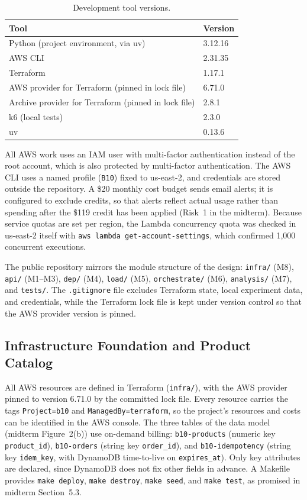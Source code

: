 \documentclass[10pt]{article}
\begin{document}
\begin{table}[htbp]
\centering
\footnotesize
\begin{tabular}{@{}ll@{}}
\toprule
\textbf{Tool} & \textbf{Version} \\
\midrule
Python (project environment, via uv) & 3.12.16 \\
AWS CLI & 2.31.35 \\
Terraform & 1.17.1 \\
AWS provider for Terraform (pinned in lock file) & 6.71.0 \\
Archive provider for Terraform (pinned in lock file) & 2.8.1 \\
k6 (local tests) & 2.3.0 \\
uv & 0.13.6 \\
\bottomrule
\end{tabular}
\caption{Development tool versions.}
\label{tab:tools}
\end{table}

All AWS work uses an IAM user with multi-factor authentication instead of the
root account, which is also protected by multi-factor authentication. The AWS
CLI uses a named profile (\texttt{B10}) fixed to us-east-2, and credentials are
stored outside the repository. A \$20 monthly cost budget sends email alerts;
it is configured to exclude credits, so that alerts reflect actual usage rather
than spending after the \$119 credit has been applied (Risk~1 in the midterm).
Because service quotas are set per region, the Lambda concurrency quota was
checked in us-east-2 itself with \texttt{aws lambda get-account-settings},
which confirmed 1{,}000 concurrent executions.

The public repository mirrors the module structure of the design:
\texttt{infra/} (M8), \texttt{api/} (M1--M3), \texttt{dep/} (M4),
\texttt{load/} (M5), \texttt{orchestrate/} (M6), \texttt{analysis/} (M7), and
\texttt{tests/}. The \texttt{.gitignore} file excludes Terraform state, local
experiment data, and credentials, while the Terraform lock file is kept under
version control so that the AWS provider version is pinned.

\subsection{Infrastructure Foundation and Product Catalog}
All AWS resources are defined in Terraform (\texttt{infra/}), with the AWS
provider pinned to version 6.71.0 by the committed lock file. Every resource
carries the tags \texttt{Project=b10} and \texttt{ManagedBy=terraform}, so the
project's resources and costs can be identified in the AWS console. The three
tables of the data model (midterm Figure~2(b)) use on-demand billing:
\texttt{b10-products} (numeric key \texttt{product\_id}), \texttt{b10-orders}
(string key \texttt{order\_id}), and \texttt{b10-idempotency} (string key
\texttt{idem\_key}, with DynamoDB time-to-live on \texttt{expires\_at}). Only key
attributes are declared, since DynamoDB does not fix other fields in advance.
A Makefile provides \texttt{make deploy}, \texttt{make destroy},
\texttt{make seed}, and \texttt{make test}, as promised in midterm Section~5.3.
\end{document}

